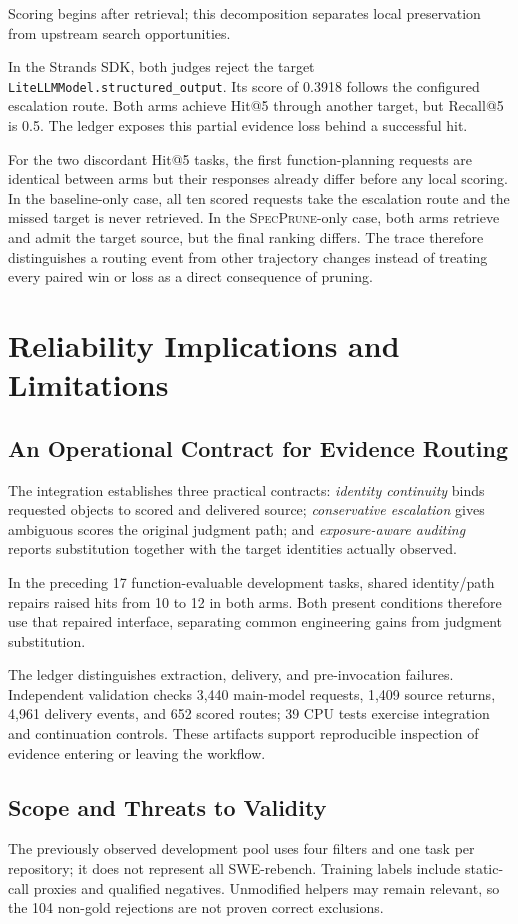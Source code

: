 \documentclass{svproc}
\newcommand{\specprune}{\textsc{SpecPrune}}
\begin{document}
Scoring begins after retrieval; this decomposition separates local preservation from upstream search opportunities.

In the Strands SDK, both judges reject the target \nolinkurl{LiteLLMModel.structured_output}. Its score of 0.3918 follows the configured escalation route. Both arms achieve Hit@5 through another target, but Recall@5 is 0.5. The ledger exposes this partial evidence loss behind a successful hit.

For the two discordant Hit@5 tasks, the first function-planning requests are identical between arms but their responses already differ before any local scoring. In the baseline-only case, all ten scored requests take the escalation route and the missed target is never retrieved. In the \specprune{}-only case, both arms retrieve and admit the target source, but the final ranking differs. The trace therefore distinguishes a routing event from other trajectory changes instead of treating every paired win or loss as a direct consequence of pruning.

\section{Reliability Implications and Limitations}
\subsection{An Operational Contract for Evidence Routing}
The integration establishes three practical contracts: \emph{identity continuity} binds requested objects to scored and delivered source; \emph{conservative escalation} gives ambiguous scores the original judgment path; and \emph{exposure-aware auditing} reports substitution together with the target identities actually observed.

In the preceding 17 function-evaluable development tasks, shared identity/path repairs raised hits from 10 to 12 in both arms. Both present conditions therefore use that repaired interface, separating common engineering gains from judgment substitution.

The ledger distinguishes extraction, delivery, and pre-invocation failures. Independent validation checks 3,440 main-model requests, 1,409 source returns, 4,961 delivery events, and 652 scored routes; 39 CPU tests exercise integration and continuation controls. These artifacts support reproducible inspection of evidence entering or leaving the workflow.

\subsection{Scope and Threats to Validity}
The previously observed development pool uses four filters and one task per repository; it does not represent all SWE-rebench. Training labels include static-call proxies and qualified negatives. Unmodified helpers may remain relevant, so the 104 non-gold rejections are not proven correct exclusions.
\end{document}
